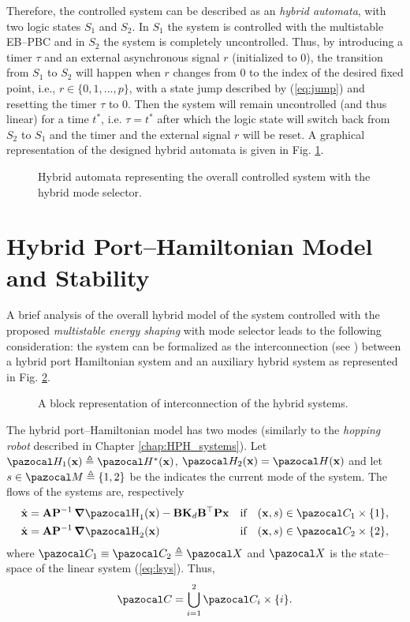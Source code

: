 Therefore, the controlled system can be described as an \textit{hybrid automata}, with two logic states $S_1$ and $S_2$. In $S_1$ the system is controlled with the multistable EB--PBC and in $S_2$ the system is completely uncontrolled. Thus, by introducing a timer $\tau$ and an external asynchronous signal $r$ (initialized to $0$), the transition from $S_1$ to $S_2$ will happen when $r$ changes from $0$ to the index of the desired fixed point, i.e., $r\in\{0,1,\dots,p\}$, with a state jump described by (\ref{eq:jump}) and resetting the timer $\tau$ to $0$. Then the system will remain uncontrolled (and thus linear) for a time $t^*$, i.e. $\tau = t^*$ after which the logic state will switch back from $S_2$ to $S_1$  and the timer and the external signal $r$ will be reset. A graphical representation of the designed hybrid automata is given in Fig. \ref{fig:automata}. 
%
\begin{figure}[!ht]
	\centering
	
	\caption{Hybrid automata representing the overall controlled system with the hybrid mode selector.}
	\label{fig:automata}
\end{figure}
%
\clearpage
\section{Hybrid Port--Hamiltonian Model and Stability}
%
A brief analysis of the overall hybrid model of the system controlled with the proposed \textit{multistable energy shaping} with {mode selector} leads to the following consideration: the system can be formalized as the interconnection (see \cite{sanfelice2011interconnections}) between a hybrid port Hamiltonian system and an auxiliary hybrid system as represented in Fig. \ref{fig:inter}.
%
\begin{figure}[!h]
	\centering
	
	\caption[A block representation of interconnection of the hybrid systems]{A block representation of interconnection of the hybrid systems.}
	\label{fig:inter}
\end{figure}
%
The hybrid port--Hamiltonian model has two modes (similarly to the \textit{hopping robot} described in Chapter \ref{chap:HPH_systems}).
Let $\Ha_1(\xb) \triangleq \Ha^*(\xb)$, $\Ha_2(\xb) = \Ha(\xb)$ and let $s\in\M\triangleq\{1,2\}$ be the indicates the current mode of the system. The flows of the systems are, respectively
%
\begin{align}
	&\dot{\xb} = \Ab\Pb^{-1}\dH_1(\xb) - \Bb\mathbf{K}_d\Bb^\top\Pb\xb &\text{if}\quad(\xb,s)\in\C_1\times\{1\},\\
	&\dot{\xb} = \Ab\Pb^{-1}\dH_2(\xb) &\text{if}\quad(\xb,s)\in\C_2\times\{2\},
\end{align}
%
where $\C_1\equiv\C_2\triangleq\X$ and $\X$ is the state--space of the linear system (\ref{eq:lsys}). Thus,
%
\begin{equation}
	\C = \bigcup_{i = 1}^2\C_i\times\{i\}.
\end{equation}
%

